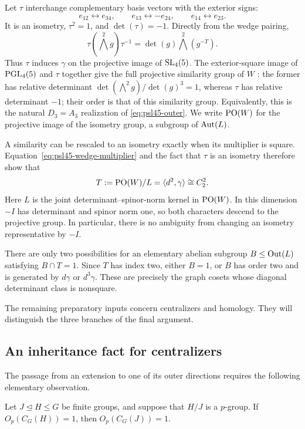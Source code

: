 Let $\tau$ interchange complementary basis vectors with the exterior
signs:
\[
 e_{12}\leftrightarrow e_{34},\qquad
 e_{13}\leftrightarrow-e_{24},\qquad
 e_{14}\leftrightarrow e_{23}.
\]
It is an isometry, $\tau^2=1$, and $\det(\tau)=-1$. Directly from
the wedge pairing,
\[
 \tau(\bigwedge^2g)\tau^{-1}
       =\det(g)\bigwedge^2(g^{-T}).
\]
Thus $\tau$ induces $\gamma$ on the projective image of $\operatorname{SL}_4(5)$.
The exterior-square image of $\operatorname{PGL}_4(5)$ and $\tau$ together give
the full projective similarity group of $W$
\citep[Theorem~12.18]{Taylor1992}: the former has
relative determinant
$\det(\bigwedge^2g)/\det(g)^3=1$, whereas $\tau$ has relative
determinant $-1$; their order is that of this similarity group.
Equivalently, this is the natural $D_3=A_3$ realization of
\eqref{eq:psl45-outer}. We write $\operatorname{PO}(W)$ for the projective image
of the isometry group, a subgroup of $\operatorname{Aut}(L)$.

A similarity can be rescaled to an isometry exactly when its
multiplier is square. Equation~\eqref{eq:psl45-wedge-multiplier}
and the fact that $\tau$ is an isometry therefore show that
\begin{equation}\label{eq:psl45-natural-outer}
 T:=\operatorname{PO}(W)/L=\langle d^2,\gamma\rangle\cong C_2^2.
\end{equation}
Here $L$ is the joint determinant--spinor-norm kernel in $\operatorname{PO}(W)$.
In this dimension $-I$ has determinant and spinor norm one, so both
characters descend to the projective group. In particular, there is
no ambiguity from changing an isometry representative by $-I$.

There are only two possibilities for an elementary abelian subgroup
$B\leq\operatorname{Out}(L)$ satisfying $B\cap T=1$. Since $T$ has index two,
either $B=1$, or $B$ has order two and is generated by
$d\gamma$ or $d^3\gamma$. These are precisely the graph cosets
whose diagonal determinant class is nonsquare.

The remaining preparatory inputs concern centralizers and homology.
They will distinguish the three branches of the final argument.

\subsection{An inheritance fact for centralizers}

The passage from an extension to one of its outer directions requires
the following elementary observation.

\begin{lemma}\label{lem:psl45-intermediate-core}
Let $J\trianglelefteq H\leq G$ be finite groups, and suppose that
$H/J$ is a $p$-group. If $O_p(C_G(H))=1$, then
$O_p(C_G(J))=1$.
\end{lemma}

